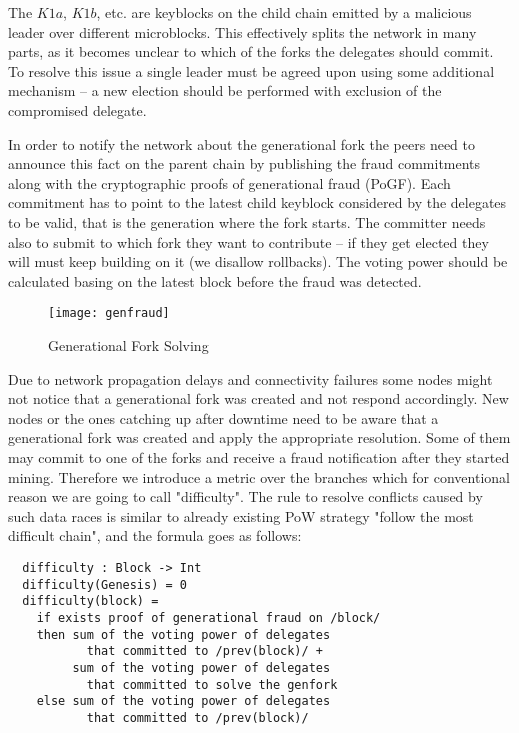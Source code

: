 The $K1a$, $K1b$, etc. are keyblocks on the child chain emitted by a malicious
leader over different microblocks. This
effectively splits the network in many parts, as it becomes unclear to which of
the forks the delegates should commit. To resolve this issue a single leader
must be agreed upon using some additional mechanism – a new election
should be performed with exclusion of the compromised delegate.

In order to notify the network about the generational fork the peers need to announce
this fact on the parent chain by publishing the fraud commitments along with the
cryptographic proofs of generational fraud (PoGF). Each commitment has to point to
the latest child keyblock considered by the delegates to be
valid, that is the generation where the fork starts. The committer
needs also to submit to which fork they want to contribute – if they get elected they
will must keep building on it (we disallow rollbacks). The voting power should be
calculated basing on the latest block before the fraud was detected.


\begin{figure}[h]
	\caption{Generational Fork Solving}
	\centering
	\texttt{[image: genfraud]}
\end{figure}

Due to network propagation
delays and connectivity failures some nodes might not notice that a generational
fork was created and not respond accordingly. New nodes or the ones catching up
after downtime need to be aware that a generational fork was created and apply
the appropriate resolution. Some of them may commit to one of the forks and receive a fraud
notification after they started mining. Therefore we introduce a metric over the
branches which for conventional reason we are going to call "difficulty". The
rule to resolve conflicts caused by such data races is similar to already
existing PoW strategy "follow the most difficult chain", and the formula goes
as follows:
\begin{minipage}{\linewidth}
\begin{lstlisting}
  difficulty : Block -> Int
  difficulty(Genesis) = 0
  difficulty(block) =
    if exists proof of generational fraud on /block/
    then sum of the voting power of delegates
           that committed to /prev(block)/ +
         sum of the voting power of delegates
           that committed to solve the genfork
    else sum of the voting power of delegates
           that committed to /prev(block)/
\end{lstlisting}
\end{minipage}

